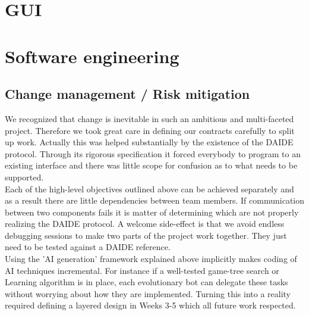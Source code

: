 \documentclass[pdftex,12pt,a4paper]{report}
\begin{document}

\chapter{GUI}



\pagebreak

\chapter{Software engineering}

\section{Change management / Risk mitigation}
We recognized that change is inevitable in such an ambitious and
multi-faceted project. Therefore we took great care in defining our
contracts carefully to split up work. Actually this was helped
substantially by the existence of the DAIDE protocol. Through its
rigorous specification it forced everybody to program to an existing
interface and there was little scope for confusion as to what needs to
be supported.  \\ Each of the high-level objectives outlined above can
be achieved separately and as a result there are little dependencies
between team members.  If communication between two components fails
it is matter of determining which are not properly realizing the DAIDE
protocol. A welcome side-effect is that we avoid endless debugging
sessions to make two parts of the project work together. They just
need to be tested against a DAIDE reference.  \\ Using the 'AI
generation' framework explained above implicitly makes coding of AI
techniques incremental. For instance if a well-tested game-tree search
or Learning algorithm is in place, each evolutionary bot can delegate
these tasks without worrying about how they are implemented. Turning
this into a reality required defining a layered design in Weeks 3-5
which all future work respected.  \\
\end{document}
